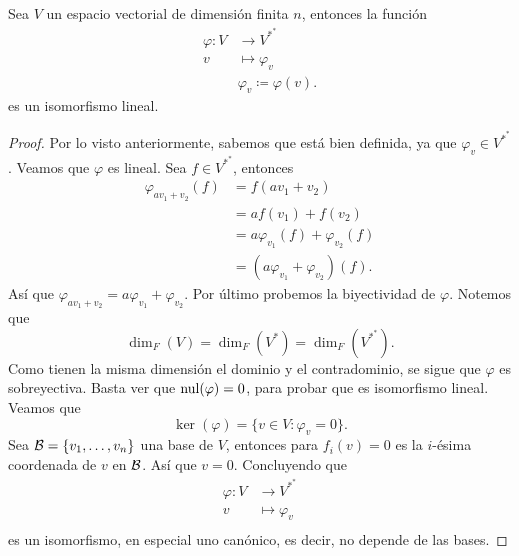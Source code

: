 \documentclass[12pt,a4paper]{book}
\newcommand{\llaves}[1]{\{#1\}}
\begin{document}
    \begin{teorema}
    \label{teo:10}
        Sea $V$ un espacio vectorial de dimensión finita $n$, entonces la función
        \begin{align*}
            \varphi: V & \longrightarrow V^{*^{*}}\\
            v & \longmapsto \varphi_{v}\\[12pt]
            &\varphi_{v} \coloneqq \varphi(v).
        \end{align*}
        es un isomorfismo lineal.
    \end{teorema}
    
    \begin{proof}
        Por lo visto anteriormente, sabemos que está bien definida, ya que $\varphi_{v} \in V^{*^{*}}$. Veamos que $\varphi$ es lineal. Sea $f \in V^{*^{*}}$, entonces 
        \begin{align*}
            \varphi_{av_{1} + v_{2}}(f) & = f(av_{1} + v_{2})\\
            & = af(v_{1}) + f({v_{2}})\\
            & = a \varphi_{v_{1}}(f) + \varphi_{v_{2}}(f)\\
            & = (a\varphi_{v_{1}} + \varphi_{v_{2}})(f).
        \end{align*}
        Así que $\varphi_{av_{1} + v_{2}} = a\varphi_{v_{1}} + \varphi_{v_{2}}$. Por último probemos la biyectividad de $\varphi$. Notemos que
        \begin{equation*}
        \dim_{F}(V) = \dim_{F}(V^{*}) = \dim_{F}(V^{*^{*}}).
        \end{equation*}
        Como tienen la misma dimensión el dominio y el contradominio, se sigue que $\varphi$ es sobreyectiva. Basta ver que $\operatorname{nul}(\varphi) = 0$, para probar que es isomorfismo lineal. Veamos que 
        \begin{equation*}
        \ker(\varphi) = \llaves{v \in V : \varphi_{v} = 0}.
        \end{equation*}
        Sea $\BB = \llaves{v_{1}, \dots, v_{n}}$ una base de $V$, entonces para $f_{i}(v) = 0$ es la $i$-ésima coordenada de $v$ en $\mathcal{B}$. Así que $v = 0$. Concluyendo que
        \begin{align*}
        \varphi: V & \longrightarrow V^{*^{*}}\\
        v & \longmapsto \varphi_{v}\\
        \end{align*}
        es un isomorfismo, en especial uno canónico, es decir, no depende de las bases.
    \end{proof}
\end{document}
